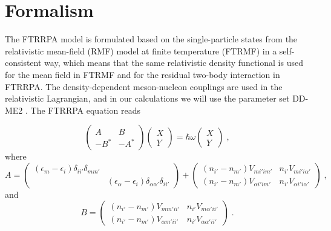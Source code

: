 \documentclass[prc,twocolumn,twoside,showpacs,superscriptaddress,floatfix]{revtex4-1}
\begin{document}
\section{Formalism}\label{formalism}

The FTRRPA model is formulated based on the single-particle states from the
relativistic mean-field (RMF) model at finite temperature (FTRMF) in a
self-consistent way, which means that the same relativistic density functional
is used for the mean field in FTRMF and for the residual two-body interaction
in FTRRPA. The density-dependent meson-nucleon couplings are used in the
relativistic Lagrangian, and in our calculations we will use the parameter set
DD-ME2 \cite{Lala}. The FTRRPA equation reads \cite{Niu_2009}

\begin{equation}
   \left( \begin{array}{cc} A & B \\ -B^* & -A^* \end{array} \right)
   \left( \begin{array}{c} X \\ Y \end{array} \right)
   = \hbar\omega \left( \begin{array}{c} X \\ Y \end{array} \right) \;,
\end{equation}
where
\begin{equation}
   A = \left( \begin{array}{cc} (\epsilon_m - \epsilon_i)
   \delta_{ii'} \delta_{mm'} &  \\
   & (\epsilon_\alpha - \epsilon_i) \delta_{\alpha \alpha'}
   \delta_{ii'} \end{array} \right)
   + \left( \begin{array}{cc} (n_{i'} - n_{m'})V_{mi'im'} & n_{i'} V_{mi'i\alpha'} \\
   (n_{i'} - n_{m'})V_{\alpha i' i m'}  &n_{i'} V_{\alpha i' i \alpha'} \end{array}
   \right) \;,
  \end{equation}
  and
\begin{equation}
   B =\left( \begin{array}{cc} (n_{i'} - n_{m'})V_{mm'ii'} & n_{i'}V_{m\alpha'ii'} \\
    (n_{i'} - n_{m'})V_{\alpha m' i i'}  & n_{i'}  V_{\alpha \alpha' i i' } \end{array}
    \right)\; .
  \end{equation}
\end{document}
